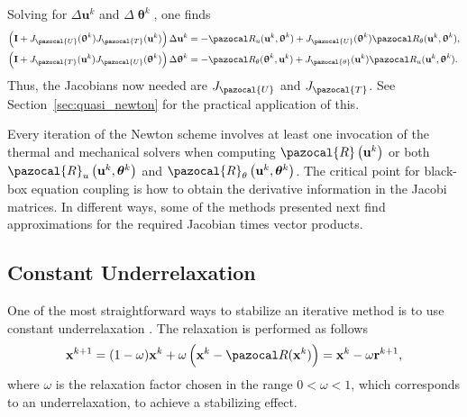 Solving for \(\Delta \mathbf u^k\) and \(\Delta \bm \uptheta^k\), one finds
\begin{align}
  \left(\mathbf I + J_\pazocal{U}(\bm\uptheta^k)J_\pazocal{T}(\mathbf u^k)\right)\Delta \mathbf u^k &= - \pazocal R_u(\mathbf u^k, \bm \uptheta^k)+J_\pazocal{U}(\bm\uptheta^k)\pazocal R_\theta(\mathbf u^k, \bm\uptheta^k), \label{eq:explicit_eq_delta_u_newton}\\
  \left(\mathbf I + J_\pazocal{T}(\mathbf u^k)J_\pazocal{U}(\bm\uptheta^k)\right)\Delta \bm\uptheta^k &= - \pazocal R_\theta(\bm \uptheta^k, \mathbf u^k)+J_\pazocal{\theta}(\mathbf u^k)\pazocal R_u(\mathbf u^k, \bm\uptheta^k). \label{eq:explicit_eq_delta_theta_newton}
\end{align}
Thus, the Jacobians now needed are \(J_\pazocal{U}\) and \(J_\pazocal{T}\).
See Section~\ref{sec:quasi_newton} for the practical application of this.

Every iteration of the Newton scheme involves at least one invocation of the thermal and mechanical solvers when computing $\pazocal{R}\left(\mathbf{u}^{k}\right)$ or both $\pazocal{R}_{u}\left(\mathbf{u}^{k}, \boldsymbol{\theta}^{k}\right)$ and $\pazocal{R}_{\theta}\left(\mathbf{u}^{k}, \boldsymbol{\theta}^{k}\right)$.
The critical point for black-box equation coupling is how to obtain the derivative information in the Jacobi matrices.
In different ways, some of the methods presented next find approximations for the required Jacobian times vector products.



\subsection{Constant Underrelaxation}

One of the most straightforward ways to stabilize an iterative method is to use constant underrelaxation \citep{gatzhammer_efficient_2014}.
The relaxation is performed as follows
\begin{equation} \label{eq:constant_relaxation}
\mathbf x^{k+1}=(1-\omega) \mathbf x^{k}+\omega\left(\mathbf x^k - \pazocal R(\mathbf x^k)\right)=\mathbf x^{k} -\omega \mathbf{r}^{k+1},
\end{equation}
where \(\omega\) is the relaxation factor chosen in the range \(0<\omega<1\), which corresponds to an underrelaxation, to achieve a stabilizing effect.

